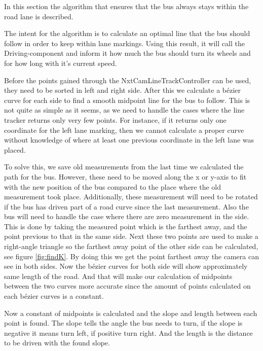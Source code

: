 
In this section the algorithm that ensures that the bus always stays within the road lane is described. 

The intent for the algorithm is to calculate an optimal line that the bus should follow in order to keep within lane markings. Using this result, it will call the Driving-component and inform it how much the bus should turn its wheels and for how long with it's current speed. 

Before the points gained through the NxtCamLineTrackController can be used, they need to be sorted in left and right side. After this we calculate a bézier curve for each side to find a smooth midpoint line for the bus to follow. This is not quite as simple as it seems, as we need to handle the cases where the line tracker returns only very few points. For instance, if it returns only one coordinate for the left lane marking, then we cannot calculate a proper curve without knowledge of where at least one previous coordinate in the left lane was placed. 

To solve this, we save old measurements from the last time we calculated the path for the bus. However, these need to be moved along the x or y-axis to fit with the new position of the bus compared to the place where the old measurement took place. Additionally, these measurement will need to be rotated if the bus has driven part of a road curve since the last measurement. Also the bus will need to handle the case where there are zero measurement in the side. This is done by taking the measured point which is the farthest away, and the point previous to that in the same side. Next these two points are used to make a right-angle triangle so the farthest away point of the other side can be calculated, see figure \ref{fig:findK}. By doing this we get the point farthest away the camera can see in both sides. Now the bézier curves for both side will show approximately same length of the road. And that will make our calculation of midpoints between the two curves more accurate since the amount of points calculated on each bézier curves is a constant.

Now a constant of midpoints is calculated and the slope and length between each point is found. The slope tells the angle the bus needs to turn, if the slope is negative it means turn left, if positive turn right. And the length is the distance to be driven with the found slope. 


